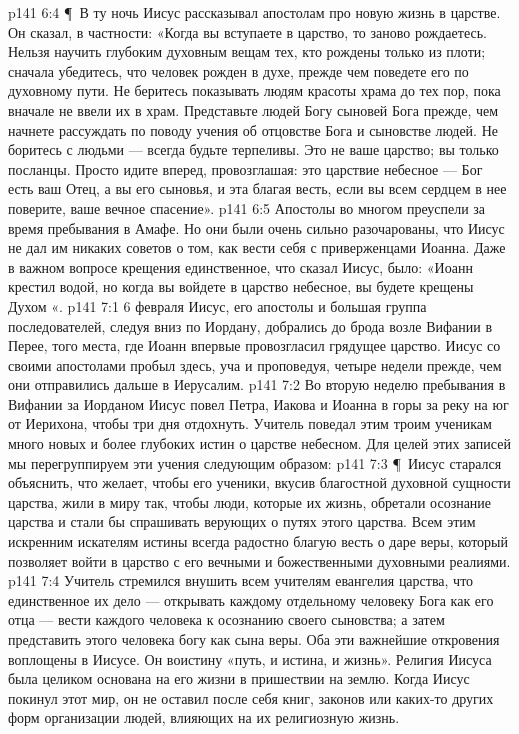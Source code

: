 \vs p141 6:4 \P\ В ту ночь Иисус рассказывал апостолам про новую жизнь в царстве. Он сказал, в частности: «Когда вы вступаете в царство, то заново рождаетесь. Нельзя научить глубоким духовным вещам тех, кто рождены только из плоти; сначала убедитесь, что человек рожден в духе, прежде чем поведете его по духовному пути. Не беритесь показывать людям красоты храма до тех пор, пока вначале не ввели их в храм. Представьте людей Богу  сыновей Бога прежде, чем начнете рассуждать по поводу учения об отцовстве Бога и сыновстве людей. Не боритесь с людьми --- всегда будьте терпеливы. Это не ваше царство; вы только посланцы. Просто идите вперед, провозглашая: это царствие небесное --- Бог есть ваш Отец, а вы его сыновья, и эта благая весть, если вы всем сердцем в нее поверите,  ваше вечное спасение».
\vs p141 6:5 Апостолы во многом преуспели за время пребывания в Амафе. Но они были очень сильно разочарованы, что Иисус не дал им никаких советов о том, как вести себя с приверженцами Иоанна. Даже в важном вопросе крещения единственное, что сказал Иисус, было: «Иоанн крестил водой, но когда вы войдете в царство небесное, вы будете крещены Духом «.
\vs p141 7:1 6 февраля Иисус, его апостолы и большая группа последователей, следуя вниз по Иордану, добрались до брода возле Вифании в Перее, того места, где Иоанн впервые провозгласил грядущее царство. Иисус со своими апостолами пробыл здесь, уча и проповедуя, четыре недели прежде, чем они отправились дальше в Иерусалим.
\vs p141 7:2 Во вторую неделю пребывания в Вифании за Иорданом Иисус повел Петра, Иакова и Иоанна в горы за реку на юг от Иерихона, чтобы три дня отдохнуть. Учитель поведал этим троим ученикам много новых и более глубоких истин о царстве небесном. Для целей этих записей мы перегруппируем эти учения следующим образом:
\vs p141 7:3 \P\ Иисус старался объяснить, что желает, чтобы его ученики, вкусив благостной духовной сущности царства, жили в миру так, чтобы люди, которые  их жизнь, обретали осознание царства и стали бы спрашивать верующих о путях этого царства. Всем этим искренним искателям истины всегда радостно  благую весть о даре веры, который позволяет войти в царство с его вечными и божественными духовными реалиями.
\vs p141 7:4 Учитель стремился внушить всем учителям евангелия царства, что единственное их дело --- открывать каждому отдельному человеку Бога как его отца --- вести каждого человека к осознанию своего сыновства; а затем представить этого человека богу как сына веры. Оба эти важнейшие откровения воплощены в Иисусе. Он воистину «путь, и истина, и жизнь». Религия Иисуса была целиком основана на его жизни в пришествии на землю. Когда Иисус покинул этот мир, он не оставил после себя книг, законов или каких\hyp{}то других форм организации людей, влияющих на их религиозную жизнь.
